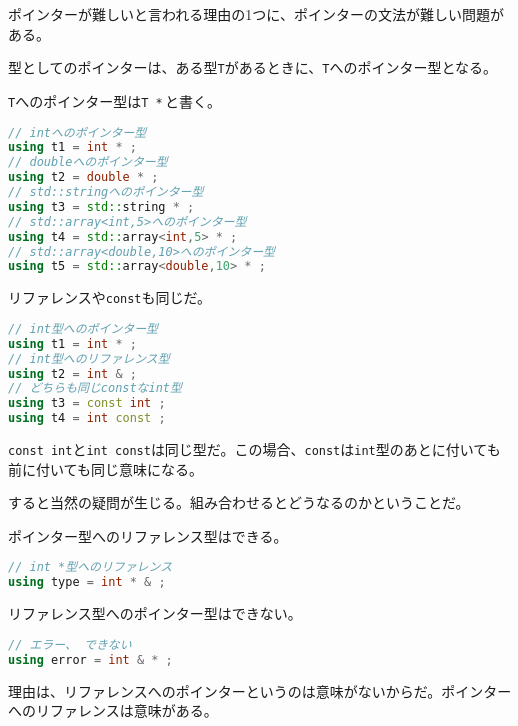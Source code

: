 
ポインターが難しいと言われる理由の1つに、ポインターの文法が難しい問題がある。


型としてのポインターは、ある型\texttt{T}があるときに、\texttt{T}へのポインター型となる。

\texttt{T}へのポインター型は\texttt{T *}\,と書く。

\begin{lstlisting}[language={C++}]
// intへのポインター型
using t1 = int * ;
// doubleへのポインター型
using t2 = double * ;
// std::stringへのポインター型
using t3 = std::string * ;
// std::array<int,5>へのポインター型
using t4 = std::array<int,5> * ;
// std::array<double,10>へのポインター型
using t5 = std::array<double,10> * ;
\end{lstlisting}

リファレンスや\texttt{const}も同じだ。

\begin{lstlisting}[language={C++}]
// int型へのポインター型
using t1 = int * ;
// int型へのリファレンス型
using t2 = int & ;
// どちらも同じconstなint型
using t3 = const int ;
using t4 = int const ;
\end{lstlisting}

\texttt{const int}と\texttt{int const}は同じ型だ。この場合、\texttt{const}は\texttt{int}型のあとに付いても前に付いても同じ意味になる。

すると当然の疑問が生じる。組み合わせるとどうなるのかということだ。

ポインター型へのリファレンス型はできる。

\ifTombow\pagebreak\fi
\begin{lstlisting}[language={C++}]
// int *型へのリファレンス
using type = int * & ;
\end{lstlisting}

リファレンス型へのポインター型はできない。

\begin{lstlisting}[language={C++}]
// エラー、 できない
using error = int & * ;
\end{lstlisting}

理由は、リファレンスへのポインターというのは意味がないからだ。ポインターへのリファレンスは意味がある。

